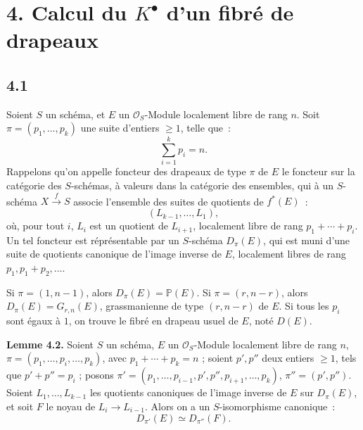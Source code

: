 \section*{4. Calcul du \(K^{\bullet}\) d'un fibré de drapeaux}

\subsection*{4.1}
Soient \(S\) un schéma, et \(E\) un \(\mathcal O_S\)-Module localement libre de rang \(n\). Soit \(\pi=(p_1,\ldots,p_k)\) une suite d'entiers \(\geq1\), telle que~:
\[
  \sum_{i=1}^k p_i=n.
\]
Rappelons qu'on appelle foncteur des drapeaux de type \(\pi\) de \(E\) le foncteur sur la catégorie des \(S\)-schémas, à valeurs dans la catégorie des ensembles, qui à un \(S\)-schéma \(X\xrightarrow{f} S\) associe l'ensemble des suites de quotients de \(f^*(E)\)~:
\[
  (L_{k-1},\ldots,L_1),
\]
où, pour tout \(i\), \(L_i\) est un quotient de \(L_{i+1}\), localement libre de rang \(p_1+\cdots+p_i\). Un tel foncteur est réprésentable par un \(S\)-schéma \(D_\pi(E)\), qui est muni d'une suite de quotients canonique de l'image inverse de \(E\), localement libres de rang \(p_1,p_1+p_2,\ldots\).

Si \(\pi=(1,n-1)\), alors \(D_\pi(E)=\mathbb P(E)\). Si \(\pi=(r,n-r)\), alors \(D_\pi(E)=G_{r,n}(E)\), grassmanienne de type \((r,n-r)\) de \(E\). Si tous les \(p_i\) sont égaux à \(1\), on trouve le fibré en drapeau usuel de \(E\), noté \(D(E)\).

\textbf{Lemme 4.2.} Soient \(S\) un schéma, \(E\) un \(\mathcal O_S\)-Module localement libre de rang \(n\), \(\pi=(p_1,\ldots,p_i,\ldots,p_k)\), avec \(p_1+\cdots+p_k=n\) ; soient \(p',p''\) deux entiers \(\geq1\), tels que \(p'+p''=p_i\) ; posons \(\pi'=(p_1,\ldots,p_{i-1},p',p'',p_{i+1},\ldots,p_k)\), \(\pi''=(p',p'')\). Soient \(L_1,\ldots,L_{k-1}\) les quotients canoniques de l'image inverse de \(E\) sur \(D_\pi(E)\), et soit \(F\) le noyau de \(L_i\to L_{i-1}\). Alors on a un \(S\)-isomorphisme canonique~:
\[
  D_{\pi'}(E)\simeq D_{\pi''}(F).
\]
